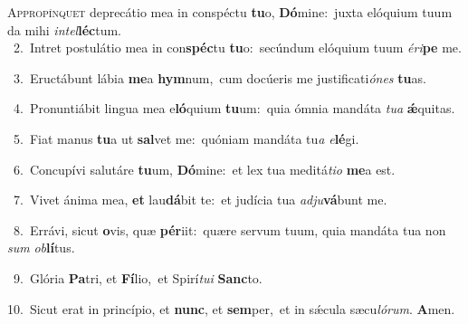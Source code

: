 \lettrine{\initial\textcolor{\initialcolor}{A}}{ppropínquet} deprecátio mea in conspéctu \textbf{tu}\-o, \textbf{Dó}\-mine:~\star juxta elóquium tuum da mihi \textit{in}\-\textit{tel}\textbf{léc}tum.\\
{\numbfont\textcolor{\numbcolor}{~2.}}~Intret postulátio mea in con\-\textbf{spéc}\-tu \textbf{tu}\-o:~\star secúndum elóquium tuum \textit{é}\-\textit{ri}\textbf{pe} me.\par
{\numbfont\textcolor{\numbcolor}{~3.}}~Eructábunt lábia \textbf{me}\-a \textbf{hym}\-num,~\star cum docúeris me justificati\-\textit{ó}\-\textit{nes} \textbf{tu}\-as.\par
{\numbfont\textcolor{\numbcolor}{~4.}}~Pronuntiábit lingua mea e\-\textbf{ló}\-quium \textbf{tu}\-um:~\star quia ómnia mandáta \textit{tu}\-\textit{a} \textbf{ǽ}\-quitas.\par
{\numbfont\textcolor{\numbcolor}{~5.}}~Fiat manus \textbf{tu}\-a ut \textbf{sal}\-vet me:~\star quóniam mandáta tu\textit{a} \textit{e}\-\textbf{lé}gi.\par
{\numbfont\textcolor{\numbcolor}{~6.}}~Concupívi salutáre \textbf{tu}\-um, \textbf{Dó}\-mine:~\star et lex tua meditá\-\textit{ti}\-\textit{o} \textbf{me}\-a est.\par
{\numbfont\textcolor{\numbcolor}{~7.}}~Vivet ánima mea, \textbf{et} lau\-\textbf{dá}\-bit te:~\star et judícia tua \textit{ad}\-\textit{ju}\textbf{vá}bunt me.\par
{\numbfont\textcolor{\numbcolor}{~8.}}~Errávi, sicut \textbf{o}\-vis, quæ \textbf{pér}\-iit:~\star quære servum tuum, quia mandáta tua non \textit{sum} \textit{ob}\-\textbf{lí}tus.\par
{\numbfont\textcolor{\numbcolor}{~9.}}~Glória \textbf{Pa}\-tri, et \textbf{Fí}\-lio,~\star et Spirí\-\textit{tu}\-\textit{i} \textbf{Sanc}\-to.\par
{\numbfont\textcolor{\numbcolor}{10.}}~Sicut erat in princípio, et \textbf{nunc}\-, et \textbf{sem}\-per,~\star et in sǽcula sæcu\-\textit{ló}\-\textit{rum}. \textbf{A}\-men.\par
